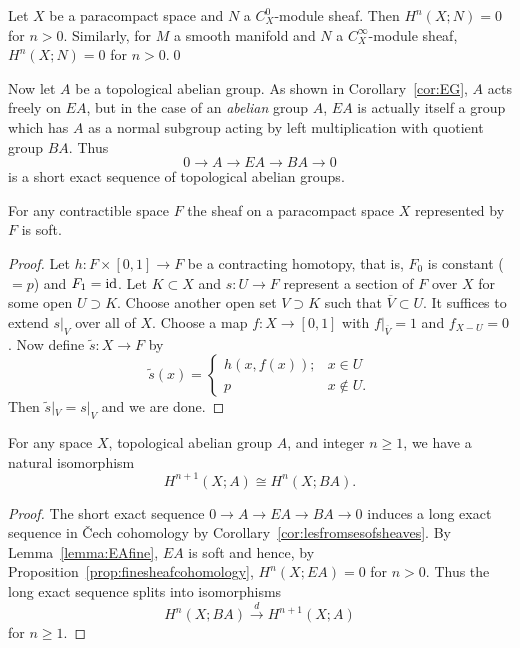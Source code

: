\documentclass[a4paper,openany]{scrbook}
\begin{document}
\begin{corollary}\label{cor:Omodulecohomology}
Let $X$ be a paracompact space and $N$ a $C^0_X$-module sheaf. Then $H^n(X;N)=0$ for $n>0$. Similarly, for $M$ a smooth manifold and $N$ a $C^\infty_X$-module sheaf, $H^n(X;N)=0$ for $n>0$.\qed
\end{corollary}


Now let $A$ be a topological abelian group. As shown in Corollary~\ref{cor:EG}, $A$ acts freely on $EA$, but in the case of an \emph{abelian} group $A$, $EA$ is actually itself a group which has $A$ as a normal subgroup acting by left multiplication with quotient group $BA$. Thus
\[
0 \to A \to EA \to BA \to 0
\]
is a short exact sequence of topological abelian groups.

\begin{lemma}\label{lemma:EAfine}
For any contractible space $F$ the sheaf on a paracompact space $X$ represented by $F$ is soft.
\end{lemma}
\begin{proof}
Let $h\colon F \times [0,1] \to F$ be a contracting homotopy, that is, $F_0$ is constant ($=p$) and $F_1=\operatorname{id}$. Let $K \subset X$ and $s\colon U \to F$ represent a section of $F$ over $X$ for some open $U \supset K$. Choose another open set $V \supset K$ such that $\overline V \subset U$. It suffices to extend $s|_V$ over all of $X$. Choose a map $f\colon X \to [0,1]$ with $f|_{\overline V} = 1$ and $f_{X-U}=0$. Now define $\tilde s\colon X \to F$ by
\[
\tilde s(x) = \begin{cases} h(x,f(x)); & x \in U\\
p\; & x \not\in U.\end{cases}
\]
Then $\tilde s|_V = s|_V$ and we are done.
\end{proof}

\begin{corollary} \label{cor:cechdimensionshift}
For any space $X$, topological abelian group $A$, and integer $n\geq 1$, we have a natural isomorphism
\[
H^{n+1}(X;A) \cong H^n(X;BA).
\]
\end{corollary}
\begin{proof}
The short exact sequence $0 \to A \to EA \to BA \to 0$ induces a long exact sequence in \v Cech cohomology by Corollary~\ref{cor:lesfromsesofsheaves}. By Lemma~\ref{lemma:EAfine}, $EA$ is soft and hence, by Proposition~\ref{prop:finesheafcohomology}, $H^n(X;EA)=0$ for $n>0$. Thus the long exact sequence splits into isomorphisms
\[
H^n(X;BA) \xrightarrow{d} H^{n+1}(X;A)
\]
for $n \geq 1$.
\end{proof}
\end{document}
